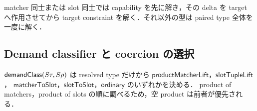 matcher 同士または slot 同士では capability を先に解き，その delta を target へ作用させてから
target constraint を解く．それ以外の型は paired type 全体を一度に解く．
\begin{mathpar}


\end{mathpar}

\subsection{Demand classifier と coercion の選択}

$\mathsf{demandClass}(S\tau,S\rho)$ は resolved type だけから
$\mathsf{productMatcherLift}$，$\mathsf{slotTupleLift}$，
$\mathsf{matcherToSlot}$，$\mathsf{slotToSlot}$，$\mathsf{ordinary}$ のいずれかを決める．
product of matchers，product of slots の順に調べるため，空 product は前者が優先される．

